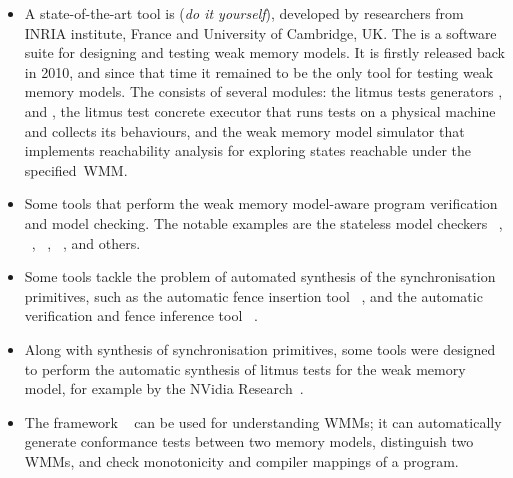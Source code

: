 \begin{itemize}[noitemsep,topsep=0pt,leftmargin=\parindent]

\item A state-of-the-art tool is  (\textit{do it yourself}), developed by researchers from INRIA institute, France and University of Cambridge, UK.
The %
%
%
is a software suite for designing and testing weak memory models.
It is firstly released back in 2010, and since that time it remained to be the only tool for testing weak memory models.
The  consists of several modules:
the litmus tests generators ,  and ,
the litmus test concrete executor  that runs tests on a physical machine and collects its behaviours,
and the weak memory model simulator  that implements reachability analysis for exploring states reachable under the specified~WMM.

\item Some tools that perform the weak memory model-aware program verification and model checking.
The notable examples are
the stateless model checkers ~\cite{kokologiannakis2017effective}, ~\cite{musuvathi2008fair}, ~\cite{abdulla2017stateless}, ~\cite{bouajjani2013checking}, and others. 

\item Some tools tackle the problem of automated synthesis of the synchronisation primitives, such as
the automatic fence insertion tool ~\cite{alglave2014don}, and
the automatic verification and fence inference tool ~\cite{kuperstein2011partial}.

\item Along with synthesis of synchronisation primitives, some tools were designed to perform the automatic synthesis of litmus tests for the weak memory model, for example  by the NVidia Research~\cite{lustig2017automated}.

\item The framework ~\cite{wickerson2017automatically} can be used for understanding WMMs; it can automatically generate conformance tests between two memory models, distinguish two WMMs, and check monotonicity and compiler mappings of a program.


\end{itemize}
